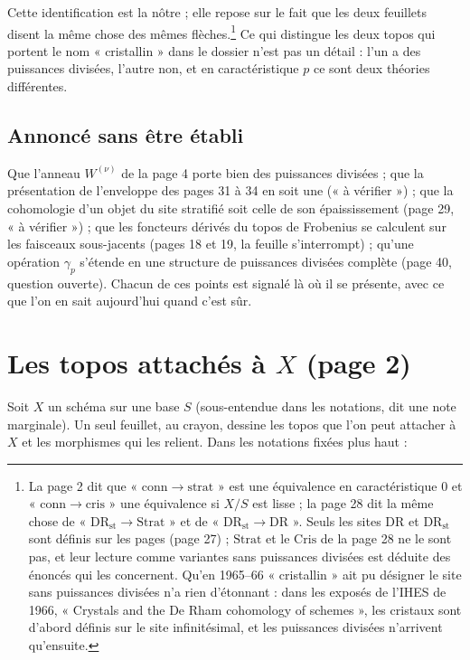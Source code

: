 \documentclass[11pt,a4paper]{article}
\begin{document}
Cette identification est la nôtre ; elle repose sur le fait que les deux
feuillets disent la même chose des mêmes flèches.\footnote{La page 2 dit que
« $\mathrm{conn} \to \mathrm{strat}$ » est une équivalence en
caractéristique $0$ et « $\mathrm{conn} \to \mathrm{cris}$ » une équivalence
si $X/S$ est lisse ; la page 28 dit la même chose de
« $\mathrm{DR}_{\mathrm{st}} \to \mathrm{Strat}$ » et de
« $\mathrm{DR}_{\mathrm{st}} \to \mathrm{DR}$ ». Seuls les sites
$\mathrm{DR}$ et $\mathrm{DR}_{\mathrm{st}}$ sont définis sur les pages (page
27) ; $\mathrm{Strat}$ et le $\mathrm{Cris}$ de la page 28 ne le sont pas, et
leur lecture comme variantes sans puissances divisées est déduite des
énoncés qui les concernent. Qu'en 1965--66 « cristallin » ait pu désigner le
site sans puissances divisées n'a rien d'étonnant : dans les exposés de
l'IHES de 1966, « Crystals and the De Rham cohomology of schemes », les
cristaux sont d'abord définis sur le site infinitésimal, et les puissances
divisées n'arrivent qu'ensuite.} Ce qui distingue les deux topos qui portent
le nom « cristallin » dans le dossier n'est pas un détail : l'un a des
puissances divisées, l'autre non, et en caractéristique $p$ ce sont deux
théories différentes.

\subsection*{Annoncé sans être établi}

Que l'anneau $W^{(\nu)}$ de la page 4 porte bien des puissances divisées ;
que la présentation de l'enveloppe des pages 31 à 34 en soit une (« à
vérifier ») ; que la cohomologie d'un objet du site stratifié soit celle de
son épaississement (page 29, « à vérifier ») ; que les foncteurs dérivés du
topos de Frobenius se calculent sur les faisceaux sous-jacents (pages 18 et
19, la feuille s'interrompt) ; qu'une opération $\gamma_p$ s'étende en une
structure de puissances divisées complète (page 40, question ouverte). Chacun
de ces points est signalé là où il se présente, avec ce que l'on en sait
aujourd'hui quand c'est sûr.

\section*{Les topos attachés à $X$ (page 2)}

Soit $X$ un schéma sur une base $S$ (sous-entendue dans les notations, dit
une note marginale). Un seul feuillet, au crayon, dessine les topos que l'on
peut attacher à $X$ et les morphismes qui les relient. Dans les notations
fixées plus haut :
\end{document}
